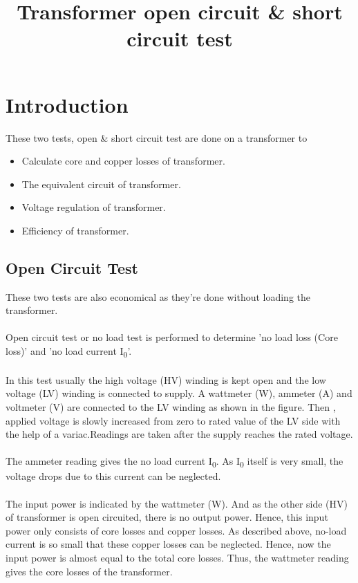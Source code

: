 \documentclass[12pt]{article}
\title{Transformer open circuit \& short circuit test}
\author{}
\date{}
\begin{document}

\pagebreak

\tableofcontents

\maketitle
\section{Introduction}
These two tests, open \& short circuit test are done on a transformer to
\begin{itemize}
    \item Calculate core and copper losses of transformer.
    \item The equivalent circuit of transformer.
    \item Voltage regulation of transformer.
    \item Efficiency of transformer.
\end{itemize}
\subsection{Open Circuit Test}

These two tests are also economical as they're done without loading the transformer.\\\\
Open circuit test or no load test is performed to determine 'no load loss (Core loss)' and 'no load current I\textsubscript{0}'.\\\\
In this test usually the high voltage (HV) winding is kept open and the low voltage (LV) winding is connected to supply. A wattmeter (W), ammeter (A) and voltmeter (V) are connected to the LV winding as shown in the figure. Then , applied voltage is slowly increased from zero to rated value of the LV side with the help of a variac.Readings are taken after the supply reaches the rated voltage.\\\\
The ammeter reading gives the no load current I\textsubscript{0}. As I\textsubscript{0} itself is very small, the voltage drops due to this current can be neglected.\\\\
The input power is indicated by the wattmeter (W). And as the other side (HV) of transformer is open circuited, there is no output power. Hence, this input power only consists of core losses and copper losses. As described above, no-load current is so small that these copper losses can be neglected. Hence, now the input power is almost equal to the total core losses. Thus, the wattmeter reading gives the core losses of the transformer.\\\cite{openShort}
\end{document}
